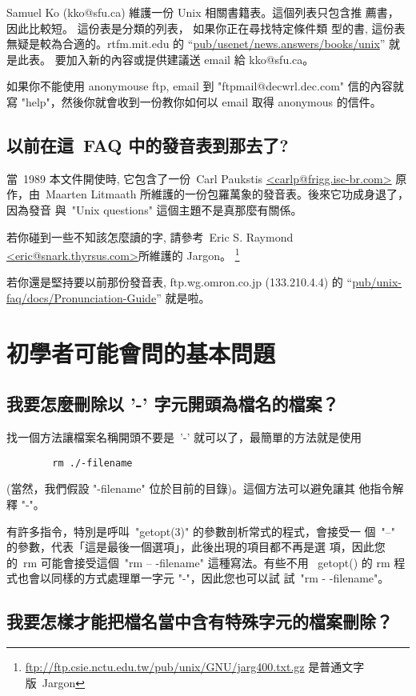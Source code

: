 \documentclass{article}
\begin{document}
\begin{CJK*}{Bg5}{ming}
	Samuel Ko (kko@sfu.ca) 維護一份 Unix 相關書籍表。這個列表只包含推
	薦書，因此比較短。 這份表是分類的列表， 如果你正在尋找特定條件類
	型的書, 這份表無疑是較為合適的。rtfm.mit.edu 的
	``\url{pub/usenet/news.answers/books/unix}''  就是此表。
	要加入新的內容或提供建議送 email 給 kko@sfu.ca。

	如果你不能使用 anonymouse ftp,  email 到 "ftpmail@decwrl.dec.com" 
	信的內容就寫 "help"，然後你就會收到一份教你如何以 email 取得 
	anonymous 的信件。

\subsection{以前在這~FAQ 中的發音表到那去了?}

	當~1989 本文件開使時, 它包含了一份~Carl Paukstis 
	\url{<carlp@frigg.isc-br.com>} 原作，由~Maarten Litmaath 
	所維護的一份包羅萬象的發音表。後來它功成身退了，因為發音
	與~"Unix questions" 這個主題不是真那麼有關係。

	若你碰到一些不知該怎麼讀的字, 請參考~Eric S. Raymond
	\url{<eric@snark.thyrsus.com>}所維護的 Jargon。
        \footnote{\url{ftp://ftp.csie.nctu.edu.tw/pub/unix/GNU/jarg400.txt.gz}
	是普通文字版~Jargon}

	若你還是堅持要以前那份發音表, ftp.wg.omron.co.jp (133.210.4.4) 的 
	``\url{pub/unix-faq/docs/Pronunciation-Guide}'' 就是啦。

\section{初學者可能會問的基本問題}
\subsection{我要怎麼刪除以 '-' 字元開頭為檔名的檔案？}

	找一個方法讓檔案名稱開頭不要是~'-' 就可以了，最簡單的方法就是使用
\begin{verbatim}
        rm ./-filename
\end{verbatim}
	(當然，我們假設 "-filename" 位於目前的目錄)。這個方法可以避免讓其
	他指令解釋 "-"。

	有許多指令，特別是呼叫~"getopt(3)" 的參數剖析常式的程式，會接受一
	個~"--" 的參數，代表「這是最後一個選項」，此後出現的項目都不再是選
	項，因此您的~rm 可能會接受這個~"rm -- -filename" 這種寫法。有些不用 
	~getopt() 的 rm 程式也會以同樣的方式處理單一字元 "-"，因此您也可以試
	試~"rm - -filename"。

\subsection{我要怎樣才能把檔名當中含有特殊字元的檔案刪除？}


\end{CJK*}
\end{document}
